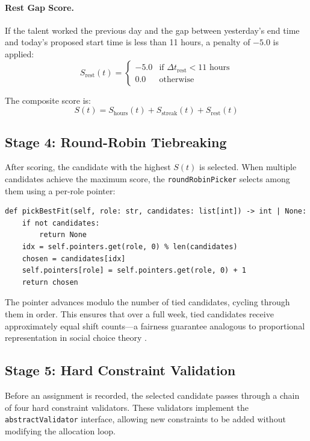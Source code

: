 \paragraph{Rest Gap Score.} If the talent worked the previous day and the gap between yesterday's end time and today's proposed start time is less than 11 hours, a penalty of $-5.0$ is applied:
\[
S_{\text{rest}}(t) = \begin{cases} -5.0 & \text{if } \Delta t_{\text{rest}} < 11 \text{ hours} \\ 0.0 & \text{otherwise} \end{cases}
\]

The composite score is:
\[
S(t) = S_{\text{hours}}(t) + S_{\text{streak}}(t) + S_{\text{rest}}(t)
\]

\subsection{Stage 4: Round-Robin Tiebreaking}

After scoring, the candidate with the highest $S(t)$ is selected. When multiple candidates achieve the maximum score, the \texttt{roundRobinPicker} selects among them using a per-role pointer:

\begin{lstlisting}[caption={Round-robin picker implementation}, label={lst:rr}]
def pickBestFit(self, role: str, candidates: list[int]) -> int | None:
    if not candidates:
        return None
    idx = self.pointers.get(role, 0) % len(candidates)
    chosen = candidates[idx]
    self.pointers[role] = self.pointers.get(role, 0) + 1
    return chosen
\end{lstlisting}

The pointer advances modulo the number of tied candidates, cycling through them in order. This ensures that over a full week, tied candidates receive approximately equal shift counts—a fairness guarantee analogous to proportional representation in social choice theory \cite{bouveret_lemaitre_2016}.

\subsection{Stage 5: Hard Constraint Validation}

Before an assignment is recorded, the selected candidate passes through a chain of four hard constraint validators. These validators implement the \texttt{abstractValidator} interface, allowing new constraints to be added without modifying the allocation loop.

